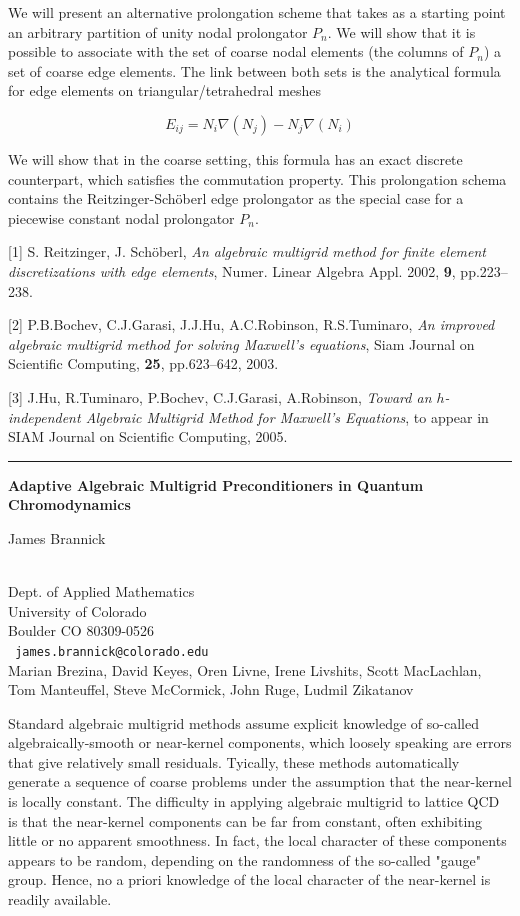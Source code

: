 \documentclass[twosided]{report}
\begin{document}
We will present an alternative prolongation scheme that takes as a
starting point an arbitrary partition of unity nodal prolongator $P_n$.
We will show that it is possible to associate with the set of coarse nodal
elements (the columns of $P_n$) a set of coarse edge elements. The link
between both sets is the analytical formula for edge elements on
triangular/tetrahedral meshes

$$ E_{ij} = N_i \nabla(N_j) - N_j \nabla(N_i)  $$

We will show that in the coarse setting, this formula has an exact
discrete counterpart, which satisfies the commutation property. This
prolongation schema contains the Reitzinger-Sch\"{o}berl edge
prolongator as the special case for a piecewise constant nodal
prolongator $P_n$.


[1] S. Reitzinger, J. Sch\"{o}berl, \emph{An algebraic multigrid method
for finite element discretizations with edge elements}, Numer. Linear
Algebra Appl. 2002, {\bf 9}, pp.223--238.

[2] P.B.Bochev, C.J.Garasi, J.J.Hu, A.C.Robinson, R.S.Tuminaro,
\emph{An
improved algebraic multigrid method for solving Maxwell's equations},
Siam Journal on Scientific Computing, {\bf 25}, pp.623--642, 2003.

[3] J.Hu, R.Tuminaro, P.Bochev, C.J.Garasi, A.Robinson, \emph{Toward an
$h$-independent Algebraic Multigrid Method for Maxwell's Equations},
to appear in SIAM Journal on Scientific Computing, 2005.


\begin{center} \rule{6in}{1pt} \end{center}
\newpage	%

\begin{center}
{\large			\label{brannick}
{\bf
Adaptive Algebraic Multigrid Preconditioners in Quantum Chromodynamics
}

James Brannick} \\
Dept. of Applied Mathematics
\\
University of Colorado
\\
Boulder CO 80309-0526
\\ {\tt
james.brannick@colorado.edu
}
\\
Marian Brezina, David Keyes, Oren Livne,
Irene Livshits, Scott MacLachlan, Tom Manteuffel,
Steve McCormick, John Ruge, Ludmil Zikatanov
\end{center}


Standard algebraic multigrid methods assume explicit knowledge of
so-called algebraically-smooth or near-kernel components, which loosely
speaking are errors that give relatively small residuals.  Tyically,
these methods automatically generate a sequence of coarse problems
under the assumption that the near-kernel is locally constant.  The
difficulty in applying algebraic multigrid to lattice QCD is that the
near-kernel components can be far from constant, often exhibiting
little or no apparent smoothness. In fact, the local character of these
components appears to be random, depending on the randomness of the
so-called "gauge" group. Hence, no a priori knowledge of the local
character of the near-kernel is readily available.
\end{document}
